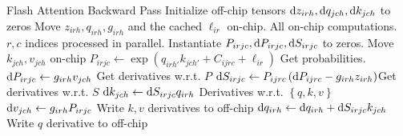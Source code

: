 \begin{algo}{Flash Attention Backward Pass}
\State Initialize off-chip tensors $ {\rm d} z _{ irh }, {\rm d} q _{ jch }, {\rm d} k _{ jch }  $ to zeros
\State Move  $ z _{ irh }, q _{ irh }, g _{ irh }$ and the cached $ \ell _{ ir } $ on-chip.
 \Comment All on-chip computations. $ r, c $ indices processed in parallel.
    \State Instantiate $ P _{ irjc },{\rm d} P _{ irjc } ,{\rm d} S _{ irjc } $  to zeros.
    \State Move  $ k_{ jch },v _{ jch }$ on-chip
    \State $ P _{ irjc } \gets   \exp \left (q _{ irh' } k _{ jch' } + C _{ ijrc } + \ell _{ ir } \right )$ \Comment Get probabilities.
    \State $ {\rm d} P _{ irjc } \gets   g _{ irh} v _{ jch }$ \Comment Get derivatives w.r.t. $ P $
    \State $ {\rm d} S _{ irjc } \gets  P _{ ijrc }\left ( {\rm d} P _{ ijrc } - g _{ irh } z _{ irh }  \right ) $\Comment Get derivatives w.r.t. $ S $
    \State $ {\rm d} k _{ jch } \gets  {\rm d} S _{ irjc }  q _{ irh }$ \Comment Derivatives w.r.t. $ \left \{q,  k, v \right \} $
    \State $ {\rm d} v _{ jch } \gets  g _{ irh }P _{ irjc }$
    \State Write $ k, v $  derivatives to off-chip
    \State $ {\rm d} q _{ irh } \gets {\rm d} q _{ irh }+ {\rm d} S _{ irjc }  k _{ jch } $
\EndFor
\State Write $ q $  derivative to off-chip
\EndFor
\label{algo_fa_bwd_advanced}
\end{algo}
